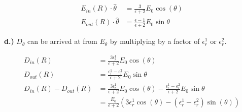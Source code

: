 \documentclass[10pt]{article} %
\begin{document}
\begin{align*}
  E_{in}(R)\cdot\hat{\theta} &= \frac{3}{\epsilon+2}E_0\cos(\theta)\\
  E_{out}(R)\cdot\hat{\theta} &= \frac{\epsilon-1}{\epsilon+2}E_0\sin\theta
\end{align*}

\textbf{d.)}
$D_\theta$ can be arrived at from $E_{\theta}$ by multiplying by a factor of $\epsilon_r^1$ or $\epsilon_r^2$. 

\begin{align*}
  D_{in}(R) &= \frac{3\epsilon_r^1}{\epsilon+2}E_0\cos(\theta)\\
  D_{out}(R) &= \frac{\epsilon_r^1-\epsilon_r^2}{\epsilon+2}E_0\sin\theta\\
  D_{in}(R) - D_{out}(R) &= \frac{3\epsilon_r^1}{\epsilon+2}E_0\cos(\theta) - \frac{\epsilon_r^1-\epsilon_r^2}{\epsilon+2}E_0\sin\theta\\
  &= \frac{E_0}{\epsilon+2}\left(3\epsilon_r^1\cos(\theta) - \left(\epsilon_r^1 - \epsilon_r^2\right)\sin(\theta)\right)
\end{align*}
\end{document}
